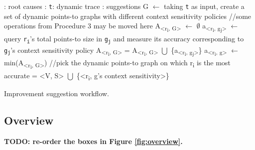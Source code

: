 \begin{algorithm}[th!]
\begin{algorithmic}[1]
{
\renewcommand{\algorithmicrequire}{\textbf{Input:}}
\renewcommand{\algorithmicensure}{\textbf{Output:}}
: root causes
\REQUIRE: {\tt t}: dynamic trace
: suggestions
\STATE G $\leftarrow$ taking {\tt t} as input, create a set of dynamic points-to graphs with different context sensitivity policies //some operations from Procedure 3 may be moved here
\STATE A\textsubscript{<r\textsubscript{i}, G>} $\leftarrow$ $\emptyset$ 
\STATE a\textsubscript{<r\textsubscript{i}, g\textsubscript{j}>} $\leftarrow$ query {\tt r\textsubscript{i}}'s total points-to size in {\tt g\textsubscript{j}} and measure its accuracy corresponding to {\tt g\textsubscript{j}}'s context sensitivity policy
\STATE A\textsubscript{<r\textsubscript{i}, G>} = A\textsubscript{<r\textsubscript{i}, G>} $\bigcup$ \{a\textsubscript{<r\textsubscript{i}, g\textsubscript{j}>}\}
\ENDFOR
\STATE a\textsubscript{<r\textsubscript{i}, g>} $\leftarrow$ min(A\textsubscript{<r\textsubscript{i}, G>}) //pick the dynamic points-to graph on which r\textsubscript{i} is the most accurate
 = <V, S> $\bigcup$ \{<r\textsubscript{i}, g's context sensitivity>\}
\ENDFOR
}
\end{algorithmic}
\caption{Improvement suggestion workflow.}
\label{alg:suggestion}
\end{algorithm}

\subsection{Overview}

{\bf TODO: re-order the boxes in Figure \ref{fig:overview}.}

